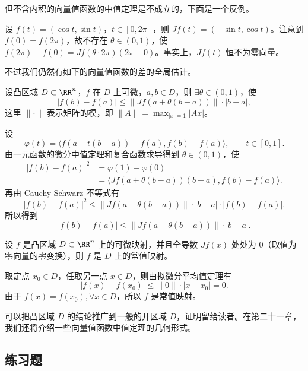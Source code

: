 但不含内积的向量值函数的中值定理是不成立的，下面是一个反例。

\begin{xexample}[19.4.2]
设 $f(t)=(\cos t,\sin t)$，$t\in[0,2\pi]$，则 $Jf(t)=(-\sin t,\cos t)$。注意到 $f(0)=f(2\pi)$，故不存在 $\theta\in(0,1)$，使 $f(2\pi)-f(0)=Jf(\theta\cdot2\pi)(2\pi-0)$。事实上，$Jf(t)$ 恒不为零向量。
\end{xexample}

不过我们仍然有如下的向量值函数的差的全局估计。

\begin{xproposition}[19.4.2（拟微分平均值定理）]
设凸区域 $D\subset\RR^n$，$f$ 在 $D$ 上可微，$a,b\in D$，则 $\exists\theta\in(0,1)$，使
\[
  |f(b)-f(a)|\le \|Jf(a+\theta(b-a))\|\cdot|b-a|,
\]
这里 $\|\cdot\|$ 表示矩阵的模，即 $\|A\|=\max_{|x|=1}|Ax|$。
\end{xproposition}
\begin{xproof}
设
\[
  \varphi(t)=\langle f(a+t(b-a))-f(a),f(b)-f(a)\rangle,\qquad t\in[0,1].
\]
由一元函数的微分中值定理和复合函数求导得到 $\theta\in(0,1)$，使
\begin{align*}
  |f(b)-f(a)|^2
  &=\varphi(1)-\varphi(0)\\
  &=\langle Jf(a+\theta(b-a))(b-a),f(b)-f(a)\rangle.
\end{align*}
再由 Cauchy-Schwarz 不等式有
\[
  |f(b)-f(a)|^2
  \le\|Jf(a+\theta(b-a))\|\cdot|b-a|\cdot|f(b)-f(a)|.
\]
所以得到
\[
  |f(b)-f(a)|\le\|Jf(a+\theta(b-a))\|\cdot|b-a|.
\]
\end{xproof}

\begin{xexample}[19.4.3]
设 $f$ 是凸区域 $D\subset\RR^n$ 上的可微映射，并且全导数 $Jf(x)$ 处处为 $0$（取值为零向量的零变换），则 $f$ 是 $D$ 上的常值映射。
\end{xexample}
\begin{xproof}
取定点 $x_0\in D$，任取另一点 $x\in D$，则由拟微分平均值定理有
\[
  |f(x)-f(x_0)|\le\|0\|\cdot|x-x_0|=0.
\]
由于 $f(x)=f(x_0),\forall x\in D$，所以 $f$ 是常值映射。
\end{xproof}
\begin{xremark}
可以把凸区域 $D$ 的结论推广到一般的开区域 $D$，证明留给读者。在第二十一章，我们还将介绍一些向量值函数中值定理的几何形式。
\end{xremark}

\subsection{练习题}


